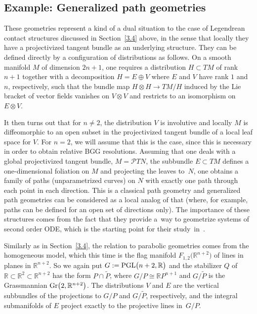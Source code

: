 \documentclass[10pt,a4paper]{amsart}
\numberwithin{equation}{section}
\def\Bbb{\mathbb}
\def\Cal{\mathcal}
\begin{document}
\subsection{Example: Generalized path geometries}\label{3.5}
These geometries represent a kind of a dual situation to the case of Legendrean
contact structures discussed in Section~\ref{3.4} above, in the sense that locally they
have a projectivized tangent bundle as an underlying structure. They can be defined
directly by a configuration of distributions as follows. On a smooth manifold $M$ of
dimension $2n+1$, one requires a distribution $H\subset TM$ of rank $n+1$ together
with a decomposition $H=E\oplus V$ where $E$ and $V$ have rank $1$ and $n$,
respectively, such that the bundle map $H\otimes H\to TM/H$ induced by the Lie
bracket of vector fields vanishes on $V\otimes V$ and restricts to an isomorphism on
$E\otimes V$.

It then turns out that for $n\neq 2$, the distribution $V$ is involutive and locally
$M$ is diffeomorphic to an open subset in the projectivized tangent bundle of a local
leaf space for $V$. For $n=2$, we will assume that this is the case, since this is
necessary in order to obtain relative BGG resolutions. Assuming that one deals with
a global projectivized tangent bundle, $M=\Cal PTN$, the subbundle $E\subset TM$
defines a one-dimensional foliation on $M$ and projecting the leaves to~$N$, one
obtains a family of paths (unparametrized curves) on $N$ with exactly one path
through each point in each direction. This is a classical path geometry and
generalized path geometries can be considered as a local analog of that (where, for
example, paths can be defined for an open set of directions only). The importance of
these structures comes from the fact that they provide a~way to geometrize systems of
second order ODE, which is the starting point for their study~in~\cite{Fels}.

Similarly as in Section~\ref{3.4}, the relation to parabolic geometries comes from the
homogeneous model, which this time is the flag manifold $F_{1,2}\bigl(\Bbb R^{n+2}\bigr)$ of
lines in planes in $\Bbb R^{n+2}$. So we again put $G:={\rm PGL}\bigl(n+2,\Bbb R\bigr)$ and the
stabilizer $Q$ of $\Bbb R\subset\Bbb R^2\subset\Bbb R^{n+2}$ has the form
$P\cap\tilde P$, where $G/P\cong\Bbb RP^{n+1}$ and $G/\tilde P$ is the Grassmannian
${\rm Gr}\bigl(2,\Bbb R^{n+2}\bigr)$. The distributions $V$ and $E$ are the vertical subbundles of
the projections to $G/P$ and $G/\tilde P$, respectively, and the integral
submanifolds of $E$ project exactly to the projective lines in~$G/P$.
\end{document}
